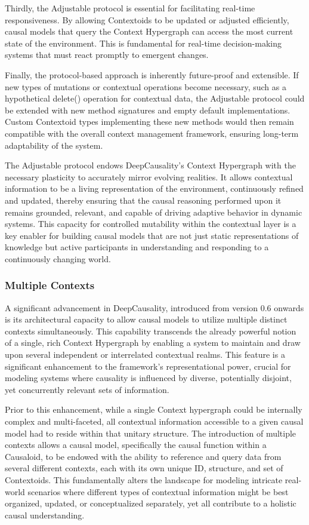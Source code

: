 Thirdly, the Adjustable protocol is essential for facilitating real-time responsiveness. By allowing Contextoids to be updated or adjusted efficiently, causal models that query the Context Hypergraph can access the most current state of the environment. This is fundamental for real-time decision-making systems that must react promptly to emergent changes. 

Finally, the protocol-based approach is inherently future-proof and extensible. If new types of mutations or contextual operations become necessary, such as a hypothetical delete() operation for contextual data, the Adjustable protocol could be extended with new method signatures and empty default implementations. Custom Contextoid types implementing these new methods would then remain compatible with the overall context management framework, ensuring long-term adaptability of the system.

The Adjustable protocol endows DeepCausality's Context Hypergraph with the necessary plasticity to accurately mirror evolving realities. It allows contextual information to be a living representation of the environment, continuously refined and updated, thereby ensuring that the causal reasoning performed upon it remains grounded, relevant, and capable of driving adaptive behavior in dynamic systems. This capacity for controlled mutability within the contextual layer is a key enabler for building causal models that are not just static representations of knowledge but active participants in understanding and responding to a continuously changing world.

\subsubsection{Multiple Contexts}

A significant advancement in DeepCausality, introduced from version 0.6 onwards is its architectural capacity to allow causal models to utilize multiple distinct contexts simultaneously. This capability transcends the already powerful notion of a single, rich Context Hypergraph by enabling a system to maintain and draw upon several independent or interrelated contextual realms. This feature is a significant enhancement to the framework's representational power, crucial for modeling systems where causality is influenced by diverse, potentially disjoint, yet concurrently relevant sets of information.

Prior to this enhancement, while a single Context hypergraph could be internally complex and multi-faceted, all contextual information accessible to a given causal model had to reside within that unitary structure. The introduction of multiple contexts allows a causal model, specifically the causal function within a Causaloid, to be endowed with the ability to reference and query data from several different contexts, each with its own unique ID, structure, and set of Contextoids. This fundamentally alters the landscape for modeling intricate real-world scenarios where different types of contextual information might be best organized, updated, or conceptualized separately, yet all contribute to a holistic causal understanding.

